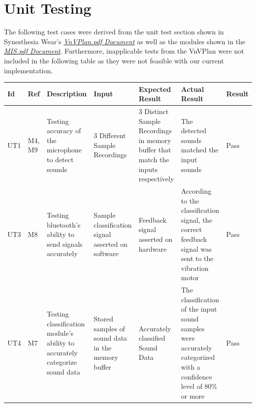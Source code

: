 \documentclass[12pt, titlepage]{article}
\begin{document}
\section{Unit Testing}
The following test cases were derived from the unit test section shown in Synesthesia Wear's \href{https://github.com/jordanbierbrier/capstone/blob/main/docs/VnVPlan/VnVPlan.pdf}{\textit{VnVPlan.pdf Document}} as well as the modules shown in the \href{https://github.com/jordanbierbrier/capstone/blob/main/docs/Design/SoftDetailedDes/MIS.pdf}{\textit{MIS.pdf Document}}.
Furthermore, inapplicable tests from the VnVPlan were not included in the following table as they were not feasible with our current implementation.
\begin{longtable}{|p{1.4cm}|p{1cm}|p{3cm}|p{1.5cm}|p{2.5cm}|p{2cm}|p{1.2cm}|}

  \endfirsthead
  \endhead
  \hline
  \textbf{Id} & \textbf{Ref} & \textbf{Description}                                                         & \textbf{Input}                                    & \textbf{Expected Result}                                    & \textbf{Actual Result} & \textbf{Result}                                    \\ \hline
  UT1       &   M4, M9   & Testing accuracy of the microphone to detect sounds                                      & 3 Different Sample Recordings                             & 3 Distinct Sample Recordings in memory buffer that match the inputs respectively                    &     The detected sounds matched the input sounds                    & {\color[HTML]{32CB00} Pass} \\ \hline
  UT3       &   M8   & Testing bluetooth's ability to send signals accurately                                                  & Sample classification signal asserted on software                 & Feedback signal asserted on hardware                        &         According to the classification signal, the correct feedback signal was sent to the vibration motor               & {\color[HTML]{32CB00} Pass} \\ \hline
  UT4       &   M7   & Testing classification module's ability to accurately categorize sound data  & Stored samples of sound data in the memory buffer              & Accurately classified Sound Data                          &         The classification of the input sound samples were accurately categorized with a confidence level of 80\% or more               &                   {\color[HTML]{32CB00} Pass}                                 \\ \hline

\end{longtable}
\end{document}
